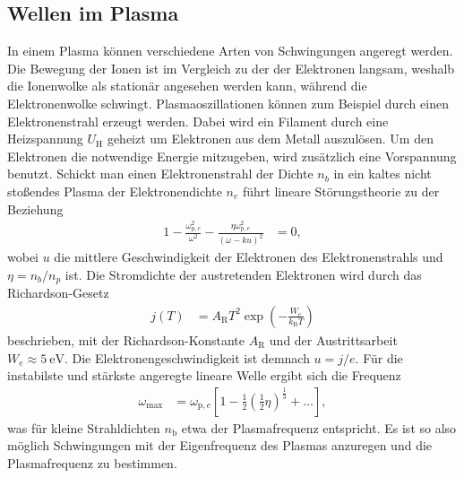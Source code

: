 \subsection{Wellen im Plasma}
In einem Plasma k\"onnen verschiedene Arten von Schwingungen angeregt werden.
Die Bewegung der Ionen ist im Vergleich zu der der Elektronen langsam, weshalb die Ionenwolke als station\"ar angesehen werden kann, w\"ahrend die Elektronenwolke schwingt.
Plasmaoszillationen k\"onnen zum Beispiel durch einen Elektronenstrahl erzeugt werden.
Dabei wird ein Filament durch eine Heizspannung $U_\text{H}$ geheizt um Elektronen aus dem Metall auszul\"osen. Um den Elektronen die notwendige Energie mitzugeben, wird zusätzlich eine Vorspannung benutzt.
Schickt man einen Elektronenstrahl der Dichte $n_b$ in ein kaltes nicht sto\ss endes Plasma der Elektronendichte $n_e$ f\"uhrt lineare St\"orungstheorie zu der Beziehung
\begin{align}
1-\frac{\omega_{\text{p},e}^2}{\omega^2}-\frac{\eta\omega_{\text{p},e}^2}{(\omega-ku)^2}
    &=0,
    \label{eq:rel1}
\end{align}
wobei $u$ die mittlere Geschwindigkeit der Elektronen des Elektronenstrahls und $\eta=n_b/n_p$ ist.
\cite{shirkawa93a}
Die Stromdichte der austretenden Elektronen wird durch das Richardson-Gesetz
\begin{align}
j(T)
    &=A_\text{R}T^2\exp(-\frac{W_e}{k_\text{B}T})
\label{eq:Richardson}
\end{align}
beschrieben, mit der Richardson-Konstante $A_\text{R}$ und der Austrittsarbeit $W_e\approx \SI{5}{\electronvolt}$.
Die Elektronengeschwindigkeit ist demnach $u=j/e$.
\cite{anleitung2}
F\"ur die instabilste und st\"arkste angeregte lineare Welle ergibt sich die Frequenz
\begin{align}
\omega_\text{max}
    &=\omega_{\text{p},e}\left[ 1-\frac{1}{2}\left(\frac{1}{2}\eta\right)^{\frac{1}{3}}+\ldots\right],
    \label{eq:wmax}
\end{align}
was f\"ur kleine Strahldichten $n_\text{b}$ etwa der Plasmafrequenz entspricht.
Es ist so also m\"oglich Schwingungen mit der Eigenfrequenz des Plasmas anzuregen und die Plasmafrequenz zu bestimmen.
\cite{shirkawa93a}

